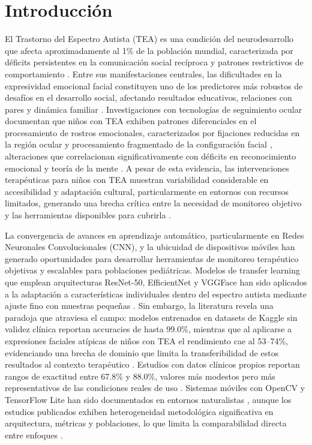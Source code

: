 \documentclass[ASNA,twocolumn]{USG}
\begin{document}
	\section{Introducción}\label{sec1}
	
	El Trastorno del Espectro Autista (TEA) es una condición del neurodesarrollo que
	afecta aproximadamente al 1\% de la población mundial, caracterizada por déficits
	persistentes en la comunicación social recíproca y patrones restrictivos de
	comportamiento \cite{Gungor2025}. Entre sus manifestaciones centrales, las
	dificultades en la expresividad emocional facial constituyen uno de los
	predictores más robustos de desafíos en el desarrollo social, afectando
	resultados educativos, relaciones con pares y dinámica familiar \cite{Johnson2025}.
	Investigaciones con tecnologías de seguimiento ocular documentan que niños con
	TEA exhiben patrones diferenciales en el procesamiento de rostros emocionales,
	caracterizados por fijaciones reducidas en la región ocular y procesamiento
	fragmentado de la configuración facial \cite{He2019}, alteraciones que correlacionan
	significativamente con déficits en reconocimiento emocional y teoría de la mente
	\cite{He2019,Reed2021,Lecciso2021}. A pesar de esta evidencia, las intervenciones
	terapéuticas para niños con TEA muestran variabilidad considerable en
	accesibilidad y adaptación cultural, particularmente en entornos con recursos
	limitados, generando una brecha crítica entre la necesidad de monitoreo objetivo
	y las herramientas disponibles para cubrirla \cite{Shaik2025}.
	
	La convergencia de avances en aprendizaje automático, particularmente en Redes
	Neuronales Convolucionales (CNN), y la ubicuidad de dispositivos móviles han
	generado oportunidades para desarrollar herramientas de monitoreo terapéutico
	objetivas y escalables para poblaciones pediátricas. Modelos de transfer learning
	que emplean arquitecturas ResNet-50, EfficientNet y VGGFace han sido aplicados a
	la adaptación a características individuales dentro del espectro autista mediante
	ajuste fino con muestras pequeñas \cite{Ahmad2024}. Sin embargo, la literatura
	revela una paradoja que atraviesa el campo: modelos entrenados en datasets de
	Kaggle sin validez clínica reportan accuracies de hasta 99.0\%, mientras que al
	aplicarse a expresiones faciales atípicas de niños con TEA el rendimiento cae al
	53--74\%, evidenciando una brecha de dominio que limita la transferibilidad de
	estos resultados al contexto terapéutico \cite{Rhatassi2024}. Estudios con datos
	clínicos propios reportan rangos de exactitud entre 67.8\% y 88.0\%, valores más
	modestos pero más representativos de las condiciones reales de uso
	\cite{Johnson2025,Radocaj2025,Washington2022}. Sistemas móviles con OpenCV y
	TensorFlow Lite han sido documentados en entornos naturalistas \cite{Sholikah2024},
	aunque los estudios publicados exhiben heterogeneidad metodológica significativa
	en arquitectura, métricas y poblaciones, lo que limita la comparabilidad directa
	entre enfoques \cite{Radocaj2025}.
	
\end{document}
